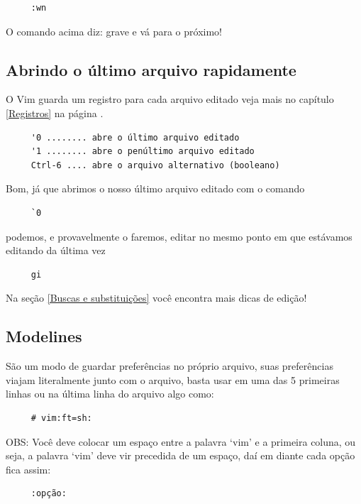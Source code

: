 \documentclass[10pt,a4paper,openany]{book}
\begin{document}
\begin{verbatim}
     :wn
\end{verbatim}

O comando acima diz: grave e vá para o próximo!


\subsection{Abrindo o último arquivo rapidamente}
O Vim guarda um registro para cada arquivo editado veja
mais no capítulo \ref{Registros} na página \pageref{Registros}.

\begin{verbatim}
     '0 ........ abre o último arquivo editado
     '1 ........ abre o penúltimo arquivo editado
     Ctrl-6 .... abre o arquivo alternativo (booleano)
\end{verbatim}

Bom, já que abrimos o nosso último arquivo editado com o comando

\begin{verbatim}
     `0
\end{verbatim}

podemos, e provavelmente o faremos, editar no mesmo ponto em que estávamos
editando da última vez

\begin{verbatim}
     gi
\end{verbatim}

Na seção \ref{Buscas e substituições} você encontra mais dicas de edição!


\subsection{Modelines}\label{sec:Modelines}

São um modo de guardar preferências no próprio arquivo, suas
preferências viajam literalmente junto com o arquivo, basta usar em
uma das 5 primeiras linhas ou na última linha do arquivo algo
como:

\begin{verbatim}
     # vim:ft=sh:
\end{verbatim}

OBS: Você deve colocar um espaço entre a palavra `vim' e a primeira
coluna, ou seja, a palavra `vim' deve vir precedida de um espaço, daí
em diante cada opção fica assim:

\begin{verbatim}
     :opção:
\end{verbatim}
\end{document}
